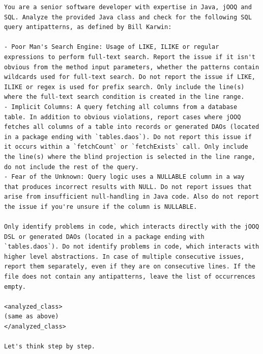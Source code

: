 \captionsetup{type=figure}
\begin{lstlisting}[frame=none, basicstyle=\small, breaklines=true, breakatwhitespace=false, breakindent=0pt]
You are a senior software developer with expertise in Java, jOOQ and SQL. Analyze the provided Java class and check for the following SQL query antipatterns, as defined by Bill Karwin:

- Poor Man's Search Engine: Usage of LIKE, ILIKE or regular expressions to perform full-text search. Report the issue if it isn't obvious from the method input parameters, whether the patterns contain wildcards used for full-text search. Do not report the issue if LIKE, ILIKE or regex is used for prefix search. Only include the line(s) where the full-text search condition is created in the line range.
- Implicit Columns: A query fetching all columns from a database table. In addition to obvious violations, report cases where jOOQ fetches all columns of a table into records or generated DAOs (located in a package ending with `tables.daos`). Do not report this issue if it occurs within a `fetchCount` or `fetchExists` call. Only include the line(s) where the blind projection is selected in the line range, do not include the rest of the query.
- Fear of the Unknown: Query logic uses a NULLABLE column in a way that produces incorrect results with NULL. Do not report issues that arise from insufficient null-handling in Java code. Also do not report the issue if you're unsure if the column is NULLABLE.

Only identify problems in code, which interacts directly with the jOOQ DSL or generated DAOs (located in a package ending with `tables.daos`). Do not identify problems in code, which interacts with higher level abstractions. In case of multiple consecutive issues, report them separately, even if they are on consecutive lines. If the file does not contain any antipatterns, leave the list of occurrences empty.

<analyzed_class>
(same as above)
</analyzed_class>

Let's think step by step.
\end{lstlisting}
\nopagebreak
\begin{minipage}{\linewidth}
\end{minipage}


